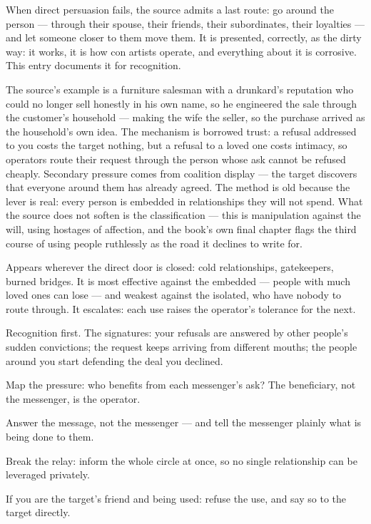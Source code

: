 \begin{core}
When direct persuasion fails, the source admits a last route: go around the person --- through their spouse, their friends, their subordinates, their loyalties --- and let someone closer to them move them. It is presented, correctly, as the dirty way: it works, it is how con artists operate, and everything about it is corrosive. This entry documents it for recognition.
\end{core}
\begin{mechanism}
The source's example is a furniture salesman with a drunkard's reputation who could no longer sell honestly in his own name, so he engineered the sale through the customer's household --- making the wife the seller, so the purchase arrived as the household's own idea. The mechanism is borrowed trust: a refusal addressed to you costs the target nothing, but a refusal to a loved one costs intimacy, so operators route their request through the person whose ask cannot be refused cheaply. Secondary pressure comes from coalition display --- the target discovers that everyone around them has already agreed. The method is old because the lever is real: every person is embedded in relationships they will not spend. What the source does not soften is the classification --- this is manipulation against the will, using hostages of affection, and the book's own final chapter flags the third course of using people ruthlessly as the road it declines to write for.
\end{mechanism}
\begin{conditions}
Appears wherever the direct door is closed: cold relationships, gatekeepers, burned bridges. It is most effective against the embedded --- people with much loved ones can lose --- and weakest against the isolated, who have nobody to route through. It escalates: each use raises the operator's tolerance for the next.
\end{conditions}
\begin{application}
  \item Recognition first. The signatures: your refusals are answered by other people's sudden convictions; the request keeps arriving from different mouths; the people around you start defending the deal you declined.
  \item Map the pressure: who benefits from each messenger's ask? The beneficiary, not the messenger, is the operator.
  \item Answer the message, not the messenger --- and tell the messenger plainly what is being done to them.
  \item Break the relay: inform the whole circle at once, so no single relationship can be leveraged privately.
  \item If you are the target's friend and being used: refuse the use, and say so to the target directly.
\end{application}
